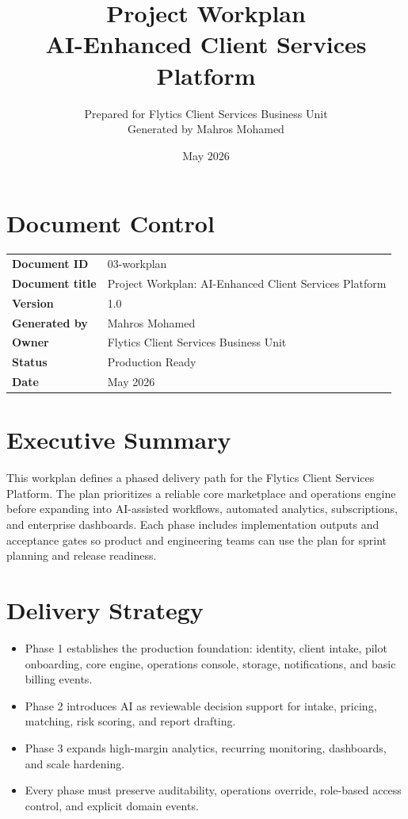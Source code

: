 \documentclass[11pt,a4paper]{article}
\title{\textbf{Project Workplan\\AI-Enhanced Client Services Platform}}
\author{Prepared for Flytics Client Services Business Unit\\Generated by Mahros Mohamed}
\date{May 2026}
\begin{document}
\maketitle
\section*{Document Control}
\begin{longtable}{>{\bfseries}p{}p{}}
\toprule
Document ID & 03-workplan \\
Document title & Project Workplan: AI-Enhanced Client Services Platform \\
Version & 1.0 \\
Generated by & Mahros Mohamed \\
Owner & Flytics Client Services Business Unit \\
Status & Production Ready \\
Date & May 2026 \\
\bottomrule
\end{longtable}

\renewcommand{\contentsname}{Contents}
\tableofcontents
\newpage

\section*{Executive Summary}

This workplan defines a phased delivery path for the Flytics Client Services Platform. The plan prioritizes a reliable core marketplace and operations engine before expanding into AI-assisted workflows, automated analytics, subscriptions, and enterprise dashboards. Each phase includes implementation outputs and acceptance gates so product and engineering teams can use the plan for sprint planning and release readiness.

\section{Delivery Strategy}

\begin{itemize}[leftmargin=*]
    \item Phase 1 establishes the production foundation: identity, client intake, pilot onboarding, core engine, operations console, storage, notifications, and basic billing events.
    \item Phase 2 introduces AI as reviewable decision support for intake, pricing, matching, risk scoring, and report drafting.
    \item Phase 3 expands high-margin analytics, recurring monitoring, dashboards, and scale hardening.
    \item Every phase must preserve auditability, operations override, role-based access control, and explicit domain events.
\end{itemize}
\end{document}
